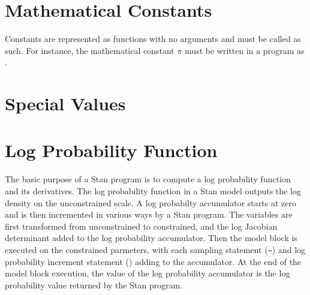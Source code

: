 \section{Mathematical Constants}\label{built-in-constants.section}

Constants are represented as functions with no arguments and must be
called as such.  For instance, the mathematical constant $\pi$ must be
written in a \Stan program as .

%
\begin{description}
%
%
%
%
%
%
\end{description}

\section{Special Values}

\begin{description}
%
%
%
%
\end{description}


\section{Log Probability Function}\label{get-lp.section}

The basic purpose of a Stan program is to compute a log probability
function and its derivatives.  The log probability function in a Stan
model outputs the log density on the unconstrained scale.  A log
probabilty accumulator starts at zero and is then incremented in
various ways by a Stan program.  The variables are first transformed
from unconstrained to constrained, and the log Jacobian determinant
added to the log probability accumulator.  Then the model block is
executed on the constrained parmeters, with each sampling statement
(\Verb|~|) and log probability increment statement
() adding to the accumulator.  At the end
of the model block execution, the value of the log probability
accumulator is the log probability value returned by the Stan program.

